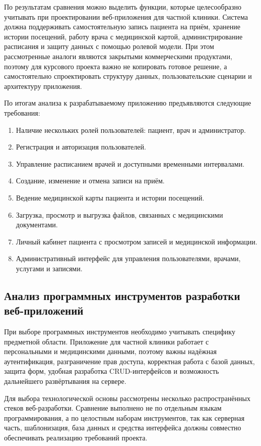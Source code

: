 По результатам сравнения можно выделить функции, которые целесообразно учитывать при проектировании веб-приложения для частной клиники. Система должна поддерживать самостоятельную запись пациента на приём, хранение истории посещений, работу врача с медицинской картой, администрирование расписания и защиту данных с помощью ролевой модели. При этом рассмотренные аналоги являются закрытыми коммерческими продуктами, поэтому для курсового проекта важно не копировать готовое решение, а самостоятельно спроектировать структуру данных, пользовательские сценарии и архитектуру приложения.

По итогам анализа к разрабатываемому приложению предъявляются следующие требования:

\begin{enumerate}
\item Наличие нескольких ролей пользователей: пациент, врач и администратор.
\item Регистрация и авторизация пользователей.
\item Управление расписанием врачей и доступными временными интервалами.
\item Создание, изменение и отмена записи на приём.
\item Ведение медицинской карты пациента и истории посещений.
\item Загрузка, просмотр и выгрузка файлов, связанных с медицинскими документами.
\item Личный кабинет пациента с просмотром записей и медицинской информации.
\item Административный интерфейс для управления пользователями, врачами, услугами и записями.
\end{enumerate}

\subsection{Анализ программных инструментов разработки веб-приложений}

При выборе программных инструментов необходимо учитывать специфику предметной области. Приложение для частной клиники работает с персональными и медицинскими данными, поэтому важны надёжная аутентификация, разграничение прав доступа, корректная работа с базой данных, защита форм, удобная разработка CRUD-интерфейсов и возможность дальнейшего развёртывания на сервере.

Для выбора технологической основы рассмотрены несколько распространённых стеков веб-разработки. Сравнение выполнено не по отдельным языкам программирования, а по целостным наборам инструментов, так как серверная часть, шаблонизация, база данных и средства интерфейса должны совместно обеспечивать реализацию требований проекта.


